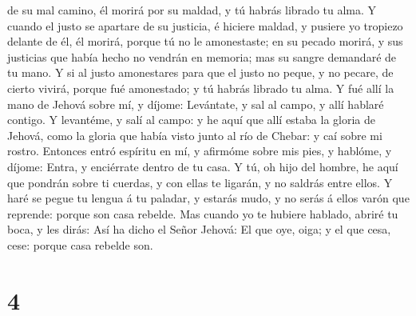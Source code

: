 de su mal camino, él morirá por su maldad, y tú habrás librado tu alma.
 Y cuando el justo se apartare de su justicia, é hiciere
maldad, y pusiere yo tropiezo delante de él, él morirá, porque tú no le
amonestaste; en su pecado morirá, y sus justicias que había hecho no
vendrán en memoria; mas su sangre demandaré de tu mano.  Y
si al justo amonestares para que el justo no peque, y no pecare, de
cierto vivirá, porque fué amonestado; y tú habrás librado tu alma.
 Y fué allí la mano de Jehová sobre mí, y díjome:
Levántate, y sal al campo, y allí hablaré contigo.  Y
levantéme, y salí al campo: y he aquí que allí estaba la gloria de
Jehová, como la gloria que había visto junto al río de Chebar: y caí
sobre mi rostro.  Entonces entró espíritu en mí, y afirmóme
sobre mis pies, y hablóme, y díjome: Entra, y enciérrate dentro de tu
casa.  Y tú, oh hijo del hombre, he aquí que pondrán sobre
ti cuerdas, y con ellas te ligarán, y no saldrás entre ellos.
 Y haré se pegue tu lengua á tu paladar, y estarás mudo, y
no serás á ellos varón que reprende: porque son casa rebelde.
 Mas cuando yo te hubiere hablado, abriré tu boca, y les
dirás: Así ha dicho el Señor Jehová: El que oye, oiga; y el que cesa,
cese: porque casa rebelde son.

\hypertarget{section-3}{%
\section{4}\label{section-3}}

